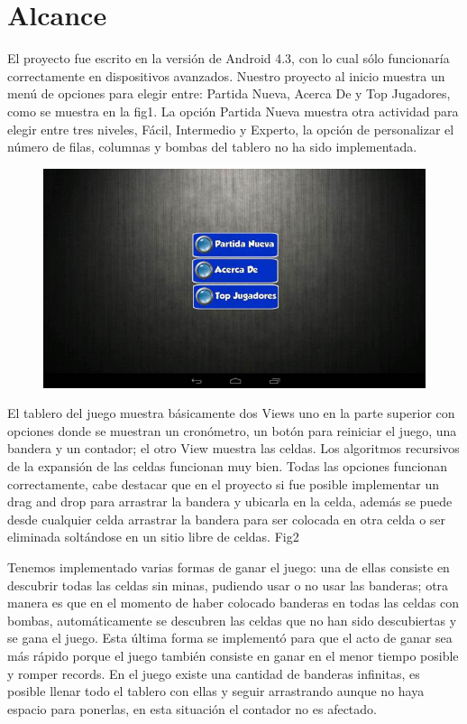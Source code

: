 \documentclass[11pt]{article} %
\begin{document}
\section{Alcance}

El proyecto fue escrito en la versión de Android 4.3, con lo cual sólo funcionaría correctamente en dispositivos avanzados.
Nuestro proyecto al inicio  muestra un menú de opciones para elegir entre: Partida Nueva, Acerca De y Top Jugadores, como se muestra en la fig1. La opción Partida Nueva muestra otra actividad para elegir entre tres niveles, Fácil, Intermedio y Experto, la opción de personalizar el número de filas, columnas y bombas del tablero no ha sido implementada. 

\begin{figure}[H]
 \begin{center}
    \includegraphics{imagenes_Documentacion/fig1}
\end{center}
\caption {}
\label{Figura 1}
\end{figure}



El tablero del juego muestra básicamente dos Views uno en la parte superior con opciones donde se muestran un cronómetro, un botón para reiniciar el juego, una bandera y un contador; el otro View muestra las celdas.  Los algoritmos recursivos de la expansión de las celdas funcionan muy bien. Todas las opciones  funcionan correctamente, cabe destacar que en el proyecto si fue posible implementar un drag and drop para arrastrar la bandera y ubicarla en la celda, además se puede desde cualquier celda arrastrar la bandera para ser colocada en otra celda o ser eliminada soltándose en un sitio libre de celdas. Fig2

Tenemos implementado varias formas de ganar el juego: una de ellas consiste en descubrir todas las celdas sin minas, pudiendo usar o no usar las banderas; otra manera es que en el momento de haber colocado banderas en todas las celdas con bombas, automáticamente se descubren las celdas que no han sido descubiertas y se gana el juego. Esta última forma se implementó para que el acto de ganar sea más rápido porque el juego también consiste en ganar en el menor tiempo posible y romper records. En el juego existe una cantidad de banderas infinitas, es posible llenar todo el tablero con ellas y seguir arrastrando aunque no haya espacio para ponerlas, en esta situación el contador no es afectado.
\end{document}

